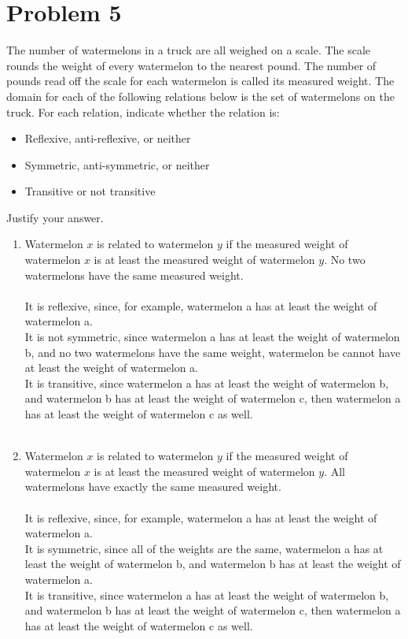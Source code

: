 \documentclass{amsart}
\theoremstyle{definition}
\theoremstyle{Exercise}
\theoremstyle{remark}
\theoremstyle{rule}
\numberwithin{equation}{section}
\begin{document}
\section*{Problem 5}

The number of watermelons in a truck are all weighed on a scale. The scale rounds the weight of every watermelon to the nearest pound. The number of pounds read off the scale for each watermelon is called its measured weight. The domain for each of the following relations below is the set of watermelons on the truck. For each relation, indicate whether the relation is:
\\
\begin{itemize}
  \item Reflexive, anti-reflexive, or neither
  \item Symmetric, anti-symmetric, or neither
  \item Transitive or not transitive
\end{itemize}
Justify your answer.\\

\begin{enumerate}[label=(\alph*)]
\item Watermelon $x$ is related to watermelon $y$ if the measured weight of watermelon $x$ is at least the measured weight of watermelon $y$. No two watermelons have the same measured weight.\\\\
It is reflexive, since, for example, watermelon a has at least the weight of watermelon a.\\
It is not symmetric, since watermelon a has at least the weight of watermelon b, and no two watermelons have the same weight, watermelon be cannot have at least the weight of watermelon a.\\
It is transitive, since watermelon a has at least the weight of watermelon b, and watermelon b has at least the weight of watermelon c, then watermelon a has at least the weight of watermelon c as well.
\\\\
\item Watermelon $x$ is related to watermelon $y$ if the measured weight of watermelon $x$ is at least the measured weight of watermelon $y$. All watermelons have exactly the same measured weight.\\\\
It is reflexive, since, for example, watermelon a has at least the weight of watermelon a.\\
It is symmetric, since all of the weights are the same, watermelon a has at least the weight of watermelon b, and watermelon b has at least the weight of watermelon a.\\
It is transitive, since watermelon a has at least the weight of watermelon b, and watermelon b has at least the weight of watermelon c, then watermelon a has at least the weight of watermelon c as well.
\\\\
\end{enumerate}
 \newpage
\end{document}
